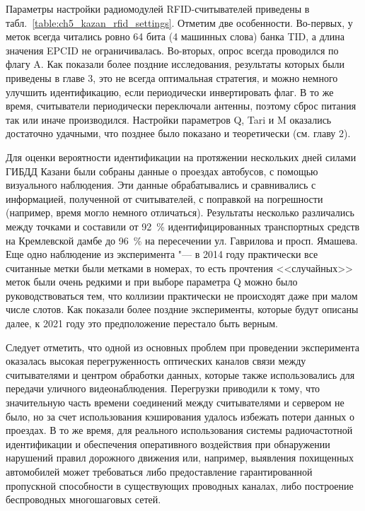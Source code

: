 Параметры настройки радиомодулей RFID-считывателей приведены в табл.~\ref{table:ch5_kazan_rfid_settings}. Отметим две особенности. Во-первых, у меток всегда читались ровно 64 бита (4 машинных слова) банка TID, а длина значения EPCID не ограничивалась. Во-вторых, опрос всегда проводился по флагу A. Как показали более поздние исследования, результаты которых были приведены в главе 3, это не всегда оптимальная стратегия, и можно немного улучшить идентификацию, если периодически инвертировать флаг. В то же время, считыватели периодически переключали антенны, поэтому сброс питания так или иначе производился. Настройки параметров Q, Tari и M оказались достаточно удачными, что позднее было показано и теоретически (см. главу 2).

Для оценки вероятности идентификации на протяжении нескольких дней силами ГИБДД Казани были собраны данные о проездах автобусов, с помощью визуального наблюдения. Эти данные обрабатывались и сравнивались с информацией, полученной от считывателей, с поправкой на погрешности (например, время могло немного отличаться). Результаты несколько различались между точками и составили от 92~\% идентифицированных транспортных средств на Кремлевской дамбе до 96~\% на пересечении ул. Гаврилова и просп. Ямашева. Еще одно наблюдение из эксперимента "--- в 2014 году практически все считанные метки были метками в номерах, то есть прочтения <<случайных>> меток были очень редкими и при выборе параметра Q можно было руководствоваться тем, что коллизии практически не происходят даже при малом числе слотов. Как показали более поздние эксперименты, которые будут описаны далее, к 2021 году это предположение перестало быть верным.

Следует отметить, что одной из основных проблем при проведении эксперимента оказалась высокая перегруженность оптических каналов связи между считывателями и центром обработки данных, которые также использовались для передачи уличного видеонаблюдения. Перегрузки приводили к тому, что значительную часть времени соединений между считывателями и сервером не было, но за счет использования кэширования удалось избежать потери данных о проездах. В то же время, для реального использования системы радиочастотной идентификации и обеспечения оперативного воздействия при обнаружении нарушений правил дорожного движения или, например, выявления похищенных автомобилей может требоваться либо предоставление гарантированной пропускной способности в существующих проводных каналах, либо построение беспроводных многошаговых сетей.


